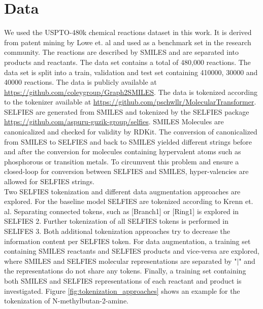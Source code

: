 \documentclass[10pt,conference,compsocconf]{IEEEtran}
\begin{document}




\section{Data}

We used the USPTO-480k chemical reactions dataset in this work. It is derived from patent mining by Lowe et. al \cite{lowe_extraction_2012}\cite{jin_predicting_2017} and used as a benchmark set in the research community. The reactions are described by SMILES and are separated into products and reactants. The data set contains a total of 480,000 reactions. The data set is split into a train, validation and test set containing 410000, 30000 and 40000 reactions. The data is publicly available at \url{https://github.com/coleygroup/Graph2SMILES}. The data is tokenized according to the tokenizer available at \url{https://github.com/pschwllr/MolecularTransformer}. SELFIES are generated from SMILES and tokenized by the SELFIES package \url{https://github.com/aspuru-guzik-group/selfies}. SMILES Molecules are canonicalized and checked for validity by RDKit. The conversion of canonicalized from SMILES to SELFIES and back to SMILES yielded different strings before and after the conversion for molecules containing hypervalent atoms such as phosphorous or transition metals. To circumvent this problem and ensure a closed-loop for conversion between SELFIES and SMILES, hyper-valencies are allowed for SELFIES strings.\\

Two SELFIES tokenization and different data augmentation approaches are explored. For the baseline model SELFIES are tokenized according to Krenn et. al\cite{SELFIES}. Separating connected tokens, such as [Branch1] or [Ring1] is explored in SELFIES 2. Further tokenization of all SELFIES tokens is performed in SELIFES 3. Both additional tokenization approaches try to decrease the information content per SELFIES token. For data augmentation, a training set containing SMILES reactants and SELFIES products and vice-versa are explored, where SMILES and SELFIES molecular representations are separated by "$\vert$" and the representations do not share any tokens. Finally, a training set containing both SMILES and SELFIES representations of each reactant and product is investigated. Figure \ref{fig:tokenization_approaches} shows an example for the tokenization of N-methylbutan-2-amine.
\end{document}
